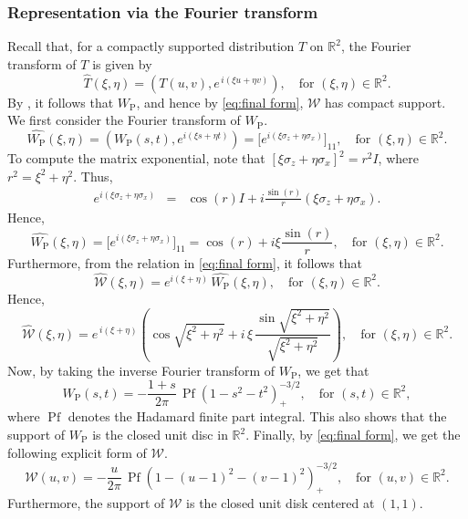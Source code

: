 \documentclass[11pt,reqno]{amsart}
\theoremstyle{plain}
\theoremstyle{definition}
\numberwithin{equation}{section}
\newcommand{\R}{\mathbb{R}}
\newcommand{\beas}{\begin{eqnarray*}}
\newcommand{\eeas}{\end{eqnarray*}}
\begin{document}
\subsubsection{Representation via the Fourier transform}
Recall that, for a compactly supported distribution $T$ on $\R^2$, the Fourier transform of $T$ is given by
\[
\widehat{T}(\xi,\eta)=( T(u,v), e^{\,i(\xi u+\eta v)} ), \quad \text{for } (\xi,\eta)\in\R^2.
\]
By \cite{SW}, it follows that $W_\mathrm P$, and hence by \eqref{eq:final form}, $\mathcal{W}$ has compact support. 
We first consider the Fourier transform of $W_\mathrm P$.
\[
\widehat{W_{\mathrm{P}}}(\xi,\eta) = ( W_{\mathrm{P}}(s,t), e^{i(\xi s + \eta t)} ) = \bigl[e^{i(\xi\sigma_z+\eta\sigma_x)}\bigr]_{11}, \quad \text{for } (\xi,\eta)\in\R^2.
\]
To compute the matrix exponential, note that $[\xi\sigma_z+\eta\sigma_x]^2=r^2I$, where $r^2=\xi^2+\eta^2$. Thus,
\beas
e^{i(\xi\sigma_z+\eta\sigma_x)}& = & \cos(r)I+i\frac{\sin(r)}{r} (\xi\sigma_z+\eta\sigma_x).
\eeas
Hence, 
\[
\widehat{W_{\mathrm{P}}}(\xi,\eta)=\bigl[e^{i(\xi\sigma_z+\eta\sigma_x)}\bigr]_{11}= \cos(r) + i\xi\frac{\sin(r)}{r},  \quad \text{for } (\xi,\eta)\in\R^2.
\]
Furthermore, from the relation in \eqref{eq:final form}, it follows that
\[
\widehat{\mathcal{W}}(\xi,\eta) = e^{i(\xi+\eta)}\,\widehat{W_{\mathrm{P}}}(\xi,\eta),  \quad \text{for } (\xi,\eta)\in\R^2.
\]
Hence,
\[
\widehat{\mathcal{W}}(\xi,\eta) =e^{\,i(\xi+\eta)}
\left(
\cos\sqrt{\xi^2+\eta^2}
+
i\,\xi\,\frac{\sin\sqrt{\xi^2+\eta^2}}{\sqrt{\xi^2+\eta^2}}
\right), \quad \text{for } (\xi,\eta)\in\R^2.
\]
Now, by taking the inverse Fourier transform of $W_\mathrm P$, we get that
\[
W_{\mathrm P}(s,t)
=
-\frac{1+s}{2\pi}\,
\operatorname{Pf}\!\left(1-s^2-t^2\right)_+^{-3/2},\quad\text{for }(s,t)\in\R^2,
\]
where $\operatorname{Pf}$ denotes the Hadamard finite part integral. This also shows that the support of $W_\mathrm P$ is the closed unit disc in $\R^2$. Finally, by \eqref{eq:final form}, we get the following explicit form of $\mathcal W$. 
\[
\mathcal W(u,v)=-\frac{u}{2\pi}\,
\operatorname{Pf}\!\left(1-(u-1)^2-(v-1)^2\right)_+^{-3/2},\quad \text{for }(u,v)\in\R^2.
\]
Furthermore, the support of $\mathcal W$ is the closed unit disk centered at $(1,1)$. 

\vspace{2mm}
\end{document}
